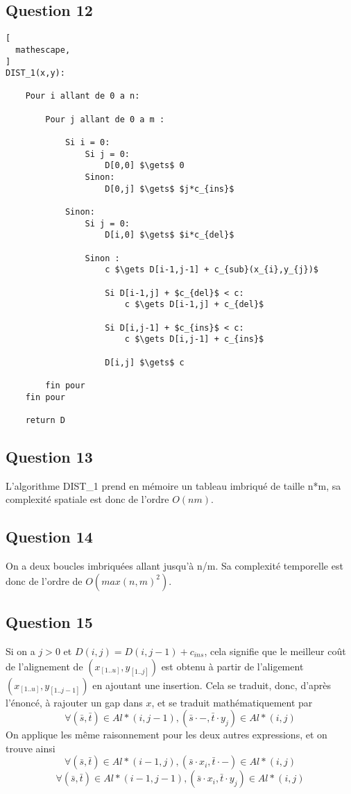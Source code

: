 \documentclass{report}
\begin{document}
\subsection*{Question 12}
\begin{lstlisting}[
  mathescape,
]
DIST_1(x,y):

    Pour i allant de 0 a n:

        Pour j allant de 0 a m :
        
            Si i = 0:
                Si j = 0:
                    D[0,0] $\gets$ 0
                Sinon:
                    D[0,j] $\gets$ $j*c_{ins}$
        
            Sinon:
                Si j = 0:
                    D[i,0] $\gets$ $i*c_{del}$
                    
                Sinon :
                    c $\gets D[i-1,j-1] + c_{sub}(x_{i},y_{j})$
                    
                    Si D[i-1,j] + $c_{del}$ < c:
                        c $\gets D[i-1,j] + c_{del}$

                    Si D[i,j-1] + $c_{ins}$ < c:
                        c $\gets D[i,j-1] + c_{ins}$
                        
                    D[i,j] $\gets$ c
                    
        fin pour
    fin pour
    
    return D
\end{lstlisting}

\clearpage

\subsection*{Question 13}
L'algorithme DIST\_1 prend en mémoire un tableau imbriqué de taille n*m, sa complexité spatiale est donc de l'ordre $O(nm)$.

\subsection*{Question 14}
On a deux boucles imbriquées allant jusqu'à n/m. Sa complexité temporelle est donc de l'ordre de $O(max(n,m)^{2})$.

\subsection*{Question 15}
Si on a $j>0$ et $D(i,j) = D(i,j-1) + c_{ins}$, cela signifie que le meilleur coût de l'alignement de $(x_{[1..u]},y_{[1..j]})$ est obtenu à partir de l'aligement  $(x_{[1..u]},y_{[1..j-1]})$ en ajoutant une insertion. Cela se traduit, donc, d'après l'énoncé, à rajouter un gap dans $x$, et se traduit mathématiquement par 
$$ \forall(\bar{s},\bar{t}) \in Al*(i,j-1),  (\bar{s}\cdot-,\bar{t}\cdot y_{j}) \in Al*(i,j) $$
On applique les même raisonnement pour les deux autres expressions, et on trouve ainsi
$$ \forall(\bar{s},\bar{t}) \in Al*(i-1,j),  (\bar{s}\cdot x_{i},\bar{t}\cdot-) \in Al*(i,j) $$
$$ \forall(\bar{s},\bar{t}) \in Al*(i-1,j-1), (\bar{s}\cdot x_{i},\bar{t}\cdot y_{j})  \in Al*(i,j) $$
\end{document}
